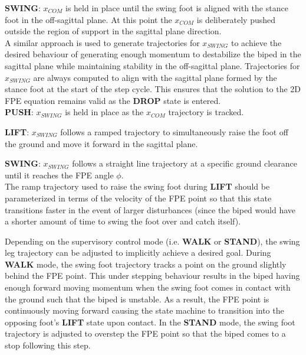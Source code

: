 \textbf{SWING}: $x_{COM}$ is held in place until the swing foot is aligned with the stance foot in the off-sagittal plane. At this point the $x_{COM}$ is deliberately pushed outside the region of support in the sagittal plane direction. \\

A similar approach is used to generate trajectories for $x_{SWING}$ to achieve the desired behaviour of generating enough momentum to destabilize the biped in the sagittal plane while maintaining stability in the off-sagittal plane. Trajectories for $x_{SWING}$ are always computed to align with the sagittal plane formed by the stance foot at the start of the step cycle. This ensures that the solution to the 2D FPE equation remains valid as the \textbf{DROP} state is entered. \\

\textbf{PUSH}: $x_{SWING}$ is held in place as the $x_{COM}$ trajectory is tracked.

\textbf{LIFT}: $x_{SWING}$ follows a ramped trajectory to simultaneously raise the foot off the ground and move it forward in the sagittal plane.

\textbf{SWING}: $x_{SWING}$ follows a straight line trajectory at a specific ground clearance until it reaches the FPE angle $\phi$. \\

The ramp trajectory used to raise the swing foot during \textbf{LIFT} should be parameterized in terms of the velocity of the FPE point so that this state transitions faster in the event of larger disturbances (since the biped would have a shorter amount of time to swing the foot over and catch itself).

Depending on the supervisory control mode (i.e. \textbf{WALK} or \textbf{STAND}), the swing leg trajectory can be adjusted to implicitly achieve a desired goal. During \textbf{WALK} mode, the swing foot trajectory tracks a point on the ground slightly behind the FPE point. This under stepping behaviour results in the biped having enough forward moving momentum when the swing foot comes in contact with the ground such that the biped is unstable. As a result, the FPE point is continuously moving forward causing the state machine to transition into the opposing foot's \textbf{LIFT} state upon contact. In the \textbf{STAND} mode, the swing foot trajectory is adjusted to overstep the FPE point so that the biped comes to a stop following this step.


